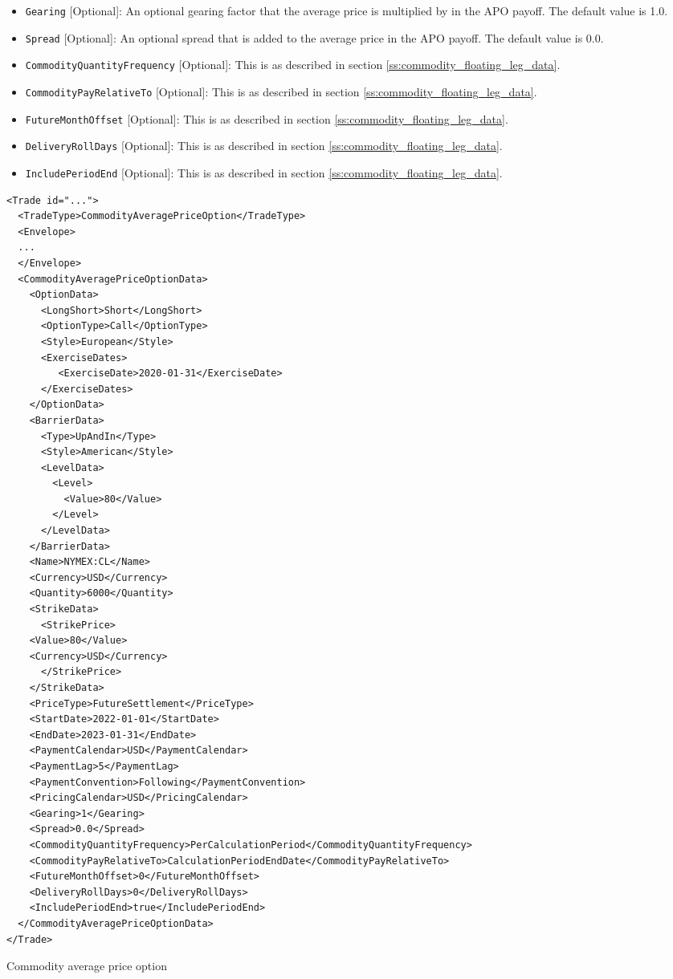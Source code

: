 \begin{itemize}
\item \lstinline!Gearing! [Optional]: An optional gearing factor that the average price is multiplied by in the APO payoff. The default value is 1.0.

\item \lstinline!Spread! [Optional]: An optional spread that is added to the average price in the APO payoff. The default value is 0.0.

\item \lstinline!CommodityQuantityFrequency! [Optional]: This is as described in section \ref{ss:commodity_floating_leg_data}.

\item \lstinline!CommodityPayRelativeTo! [Optional]: This is as described in section \ref{ss:commodity_floating_leg_data}.

\item \lstinline!FutureMonthOffset! [Optional]: This is as described in section \ref{ss:commodity_floating_leg_data}.

\item \lstinline!DeliveryRollDays! [Optional]: This is as described in section \ref{ss:commodity_floating_leg_data}.

\item \lstinline!IncludePeriodEnd! [Optional]: This is as described in section \ref{ss:commodity_floating_leg_data}.

\end{itemize}

\begin{listing}[h!]
\begin{verbatim}
<Trade id="...">
  <TradeType>CommodityAveragePriceOption</TradeType>
  <Envelope>
  ...
  </Envelope>
  <CommodityAveragePriceOptionData>
    <OptionData>
      <LongShort>Short</LongShort>
      <OptionType>Call</OptionType>
      <Style>European</Style>
      <ExerciseDates>
         <ExerciseDate>2020-01-31</ExerciseDate>
      </ExerciseDates>
    </OptionData>
    <BarrierData>
      <Type>UpAndIn</Type>
      <Style>American</Style>
      <LevelData>
        <Level>
          <Value>80</Value>
        </Level>
      </LevelData>
    </BarrierData>
    <Name>NYMEX:CL</Name>
    <Currency>USD</Currency>
    <Quantity>6000</Quantity>
    <StrikeData>
      <StrikePrice>
	<Value>80</Value>
	<Currency>USD</Currency>
      </StrikePrice>
    </StrikeData>
    <PriceType>FutureSettlement</PriceType>
    <StartDate>2022-01-01</StartDate>
    <EndDate>2023-01-31</EndDate>
    <PaymentCalendar>USD</PaymentCalendar>
    <PaymentLag>5</PaymentLag>
    <PaymentConvention>Following</PaymentConvention>
    <PricingCalendar>USD</PricingCalendar>
    <Gearing>1</Gearing>
    <Spread>0.0</Spread>
    <CommodityQuantityFrequency>PerCalculationPeriod</CommodityQuantityFrequency>
    <CommodityPayRelativeTo>CalculationPeriodEndDate</CommodityPayRelativeTo>
    <FutureMonthOffset>0</FutureMonthOffset>
    <DeliveryRollDays>0</DeliveryRollDays>
    <IncludePeriodEnd>true</IncludePeriodEnd>
  </CommodityAveragePriceOptionData>
</Trade>
\end{verbatim}
\caption{Commodity average price option}
\label{lst:commodity_apo}
\end{listing}
